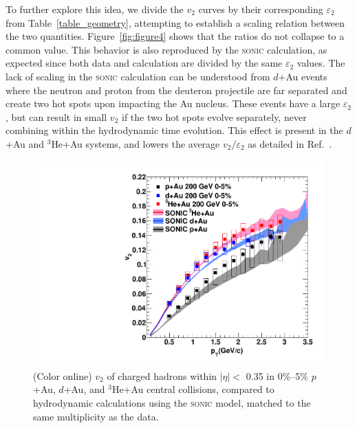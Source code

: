 \documentclass[%
reprint,
showpacs,preprintnumbers,
 amsmath,amssymb,
 aps,
]{revtex4-1}
\newcommand{\dau}{\mbox{$d$+Au}\xspace}
\newcommand{\pau}{\mbox{$p$+Au}\xspace}
\newcommand{\hau}{\mbox{$^3\text{He}$+Au}\xspace}
\begin{document}
To further explore this idea, we divide the $v_2$ curves by their corresponding $\varepsilon_2$ from Table~\ref{table_geometry}, attempting to establish a scaling relation between the two quantities. Figure~\ref{fig:figure4} shows that the ratios do not collapse to a common value. This behavior is also reproduced by the \textsc{sonic} calculation, as expected since both data and calculation are divided by the same $\varepsilon_2$ values. The lack of scaling in the \textsc{sonic} calculation can be understood from \dau events where the neutron and proton from the deuteron projectile are far separated and create two hot spots upon impacting the Au nucleus. These events have a large $\varepsilon_2$, but can result in small $v_2$ if the two hot spots evolve separately, never combining within the hydrodynamic time evolution. This effect is present in the \dau and \hau systems, and lowers the average $v_2/\varepsilon_2$ as detailed in Ref.~\cite{nagle_exploiting_2013}. 

\begin{figure}[htbp]
  \includegraphics[scale=0.45]{Figures/figure3.pdf}
  \caption{(Color online) $v_2$ of charged hadrons within $|\eta| <$ 0.35 in 0\%--5\% \pau, \dau, and \hau central collisions, compared to hydrodynamic calculations using the \textsc{sonic} model, matched to the same multiplicity as the data.}
\label{fig:figure3}
\end{figure}
\end{document}
